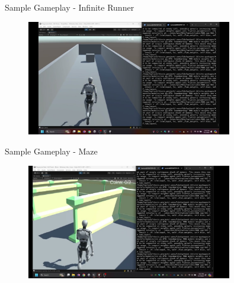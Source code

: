 \begin{frame}{Sample Gameplay - Infinite Runner}
    \begin{figure}[htpb!]
        \centering
        \href{https://youtu.be/13iwuG1pyk0}{%
        \includegraphics[width=0.8\textwidth]{figures/gameplay/infinite_runner}%
        }
    \end{figure}
\end{frame}

\begin{frame}{Sample Gameplay - Maze}
    \begin{figure}[htpb!]
        \centering
        \href{https://youtu.be/aBgP87yz1Lw}{%
        \includegraphics[width=0.8\textwidth]{figures/gameplay/maze}%
        }
    \end{figure}
\end{frame}